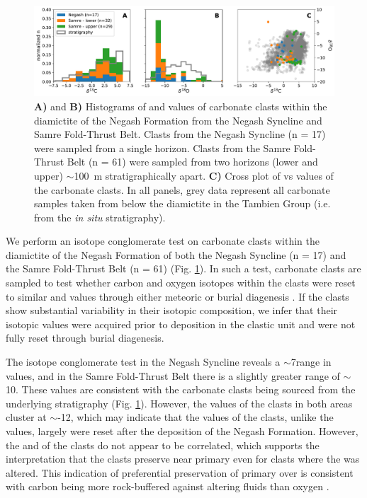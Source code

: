 \begin{figure}[h!]
\begin{center}
	\includegraphics[width=\textwidth]{figures/Tambien/clast-analysis.pdf}
	\caption[Isotope conglomerate test.]{\textbf{A)} and \textbf{B)} Histograms of \dC and \dO values of carbonate clasts within the diamictite of the Negash Formation from the Negash Syncline and Samre Fold-Thrust Belt. Clasts from the Negash Syncline (n = 17) were sampled from a single horizon. Clasts from the Samre Fold-Thrust Belt (n = 61) were sampled from two horizons (lower and upper) $\sim$100~m stratigraphically apart. \textbf{C)} Cross plot of \dC vs \dO values of the carbonate clasts. In all panels, grey data represent all carbonate samples taken from below the diamictite in the Tambien Group (i.e. from the \textit{in situ} stratigraphy).}
	\label{fig:clast-analysis}
\end{center}
\end{figure}

We perform an isotope conglomerate test on carbonate clasts within the diamictite of the Negash Formation of both the Negash Syncline (n = 17) and the Samre Fold-Thrust Belt (n = 61) (Fig. \ref{fig:clast-analysis}). In such a test, carbonate clasts are sampled to test whether carbon and oxygen isotopes within the clasts were reset to similar \dC and \dO values through either meteoric or burial diagenesis \citep{Husson2012a, Husson2015a}. If the clasts show substantial variability in their isotopic composition, we infer that their isotopic values were acquired prior to deposition in the clastic unit and were not fully reset through burial diagenesis.

The isotope conglomerate test in the Negash Syncline reveals a $\sim$7\permil range in \dC values, and in the Samre Fold-Thrust Belt there is a slightly greater range of $\sim$10\permil. These values are consistent with the carbonate clasts being sourced from the underlying stratigraphy (Fig. \ref{fig:clast-analysis}). However, the \dO values of the clasts in both areas cluster at $\sim$-12\permil, which may indicate that the \dO values of the clasts, unlike the \dC values, largely were reset after the deposition of the Negash Formation. However, the \dC and \dO of the clasts do not appear to be correlated, which supports the interpretation that the clasts preserve near primary \dC even for clasts where the \dO was altered. This indication of preferential preservation of primary \dC over \dO is consistent with carbon being more rock-buffered against altering fluids than oxygen \citep{Banner1990a}.

